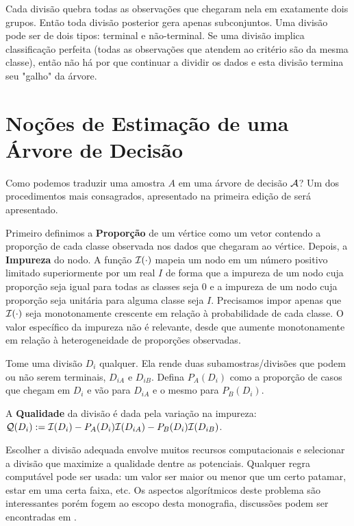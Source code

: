 Cada divisão quebra todas as observações que chegaram nela em exatamente dois grupos. Então toda divisão posterior gera apenas subconjuntos. Uma divisão pode ser de dois tipos: terminal e não-terminal. Se uma divisão implica classificação perfeita (todas as observações que atendem ao critério são da mesma classe), então não há por que continuar a dividir os dados e esta divisão termina seu "galho" da árvore. 

\section{Noções de Estimação de uma Árvore de Decisão}

Como podemos traduzir uma amostra $A$ em uma árvore de decisão $\mathcal{A}$? Um dos procedimentos mais consagrados, apresentado na primeira edição de \cite{breiman2017classification} será apresentado.

Primeiro definimos a \textbf{Proporção} de um vértice como um vetor contendo a proporção de cada classe observada nos dados que chegaram ao vértice. Depois, a \textbf{Impureza} do nodo. A função $\mathcal{I}(\cdot)$ mapeia um nodo em um número positivo limitado superiormente por um real $I$ de forma que a impureza de um nodo cuja proporção seja igual para todas as classes seja $0$ e a impureza de um nodo cuja proporção seja unitária para alguma classe seja $I$. Precisamos impor apenas que $\mathcal{I}(\cdot)$ seja monotonamente crescente em relação à probabilidade de cada classe. O valor específico da impureza não é relevante, desde que aumente monotonamente em relação à heterogeneidade de proporções observadas.

Tome uma divisão $D_i$ qualquer. Ela rende duas subamostras/divisões que podem ou não serem terminais, $D_{iA}$ e $D_{iB}$. Defina $P_A (D_i)$ como a proporção de casos que chegam em $D_i$ e vão para $D_{iA}$ e o mesmo para $P_B (D_i)$.

\begin{defi}
A \textbf{Qualidade} da divisão é dada pela variação na impureza: $\mathcal{Q} (D_i) := \mathcal{I}(D_i) - P_A(D_i) \mathcal{I} (D_{iA}) - P_B(D_i) \mathcal{I} (D_{iB})$.
\end{defi}

 Escolher a divisão adequada envolve muitos recursos computacionais e selecionar a divisão que maximize a qualidade dentre as potenciais. Qualquer regra computável pode ser usada: um valor ser maior ou menor que um certo patamar, estar em uma certa faixa, etc. Os aspectos algorítmicos deste problema são interessantes porém fogem ao escopo desta monografia, discussões podem ser encontradas em \cite{de1991distance}.
 
